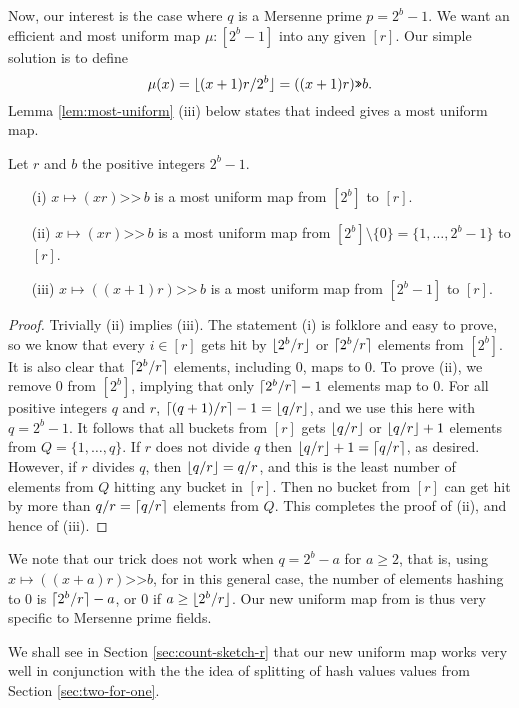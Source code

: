 Now, our interest is the case where $q$ is a Mersenne prime $p=2^b-1$. We want
an efficient and most uniform map $\mu:[2^b-1]$ into any given $[r]$.
Our simple solution is to define
\begin{equation}\label{eq:most-uniform}
\mu(x)=\lfloor {(x+1)r/2^b} \rfloor=((x+1)r)\texttt{>>} b.
\end{equation}
Lemma \ref{lem:most-uniform} (iii) below 
states that  indeed
gives a most uniform map. 
\begin{lemma}\label{lem:most-uniform} Let $r$ and $b$ the positive integers
$2^b-1$. 
\begin{itemize}
\item[(i)] $x\mapsto (xr)\texttt{>>}\,b$ is a most
uniform map from $[2^b]$ to $[r]$.
\item[(ii)] $x\mapsto (xr)\texttt{>>}\,b$ is a most
uniform map from $[2^b]\setminus\{0\}=\{1,\ldots,2^b-1\}$ to $[r]$.
\item[(iii)] $x\mapsto ((x+1)r)\texttt{>>}\, b$ is a most
uniform map from $[2^b-1]$ to $[r]$.
\end{itemize}
\end{lemma}
\begin{proof}
Trivially (ii) implies (iii). 
The statement (i) is folklore and easy to prove, so we know that every
$i\in[r]$ gets hit by $\lfloor {2^b/r} \rfloor$ or $\lceil {2^b/r}\rceil$ elements from
$[2^b]$. It is also clear that $\lceil {2^b/r}\rceil$ elements, including $0$,
maps to $0$. To prove (ii), we remove $0$ from $[2^b]$, 
implying that only
$\lceil {2^b/r}\rceil-1$ elements map to $0$. For all positive integers $q$
and $r$, $\lceil {(q+1)/r}\rceil-1=\lfloor {q/r} \rfloor$, and we use this here with 
$q=2^b-1$. It follows that all buckets from $[r]$ gets $\lfloor {q/r} \rfloor$
or $\lfloor {q/r} \rfloor+1$ elements from $Q=\{1,\ldots,q\}$. If $r$ does
not divide $q$ then $\lfloor {q/r} \rfloor+1=\lceil {q/r}\rceil$, as desired. However,
if $r$ divides $q$, then $\lfloor {q/r} \rfloor=q/r$, and this
is the least number of elements from $Q$ hitting any bucket in $[r]$. Then 
no bucket from $[r]$ can get hit by more than $q/r=\lceil {q/r}\rceil$ 
elements from $Q$. This completes the proof of (ii), and hence of (iii).
\end{proof}
We note that our trick does not work when $q=2^b-a$ for $a\geq 2$, that is,
using $x\mapsto ((x+a)r)\texttt{>>} b$, for in this general case, 
the number of elements hashing to $0$ is $\lceil {2^b/r}\rceil-a$, or $0$ if
 $a\geq \lfloor {2^b/r} \rfloor$. Our new uniform map from 
is thus very specific to Mersenne prime fields.

We shall see in Section \ref{sec:count-sketch-r} that our new uniform map
works very well in conjunction with the the idea of splitting of hash values 
values from Section \ref{sec:two-for-one}.




